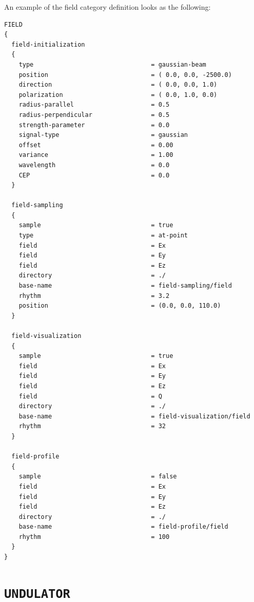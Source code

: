 %
An example of the field category definition looks as the following:
%
\begin{snugshade}
\begin{Verbatim}[fontsize=\small, tabsize = 4]
FIELD
{
  field-initialization
  {
    type                                = gaussian-beam
    position                            = ( 0.0, 0.0, -2500.0)
    direction                           = ( 0.0, 0.0, 1.0)
    polarization                        = ( 0.0, 1.0, 0.0)
    radius-parallel                     = 0.5
    radius-perpendicular                = 0.5
    strength-parameter                  = 0.0
    signal-type                         = gaussian
    offset                              = 0.00
    variance                            = 1.00
    wavelength                          = 0.0
    CEP                                 = 0.0
  }

  field-sampling
  {
    sample                              = true
    type                                = at-point
    field                               = Ex
    field                               = Ey
    field                               = Ez
    directory                           = ./
    base-name                           = field-sampling/field
    rhythm                              = 3.2
    position                            = (0.0, 0.0, 110.0)
  }

  field-visualization
  {
    sample                              = true
    field                               = Ex
    field                               = Ey
    field                               = Ez
    field                               = Q
    directory                           = ./
    base-name                           = field-visualization/field
    rhythm                              = 32
  }

  field-profile
  {
    sample                              = false
    field                               = Ex
    field                               = Ey
    field                               = Ez
    directory                           = ./
    base-name                           = field-profile/field
    rhythm                              = 100
  }
}
\end{Verbatim}
\end{snugshade}

\section{\texttt{UNDULATOR}}

